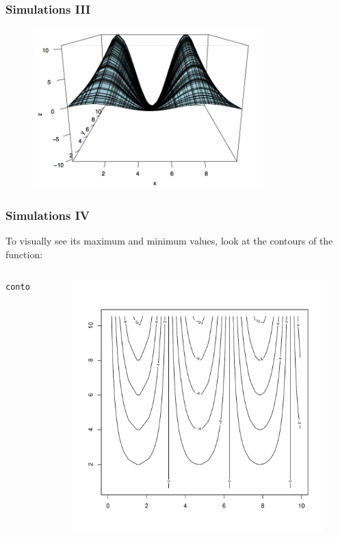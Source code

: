 \begin{frame}[fragile]
\frametitle{Simulations III}
   \begin{figure}[ht]
       \begin{center}
		\includegraphics[width = 3.5in]{images/simulation.png}
	\end{center}
   \end{figure}
\end{frame}

\begin{frame}[fragile]
\frametitle{Simulations IV}
To visually see its maximum and minimum values, look at the contours of the function:

    \begin{columns}[Tc]

\begin{lstlisting}
contour(x,y,z)
\end{lstlisting}

   \begin{figure}[ht]
       \begin{center}
		\includegraphics[scale=0.33]{images/contourSim.pdf}
	\end{center}
   \end{figure}
\end{columns}

\end{frame}




